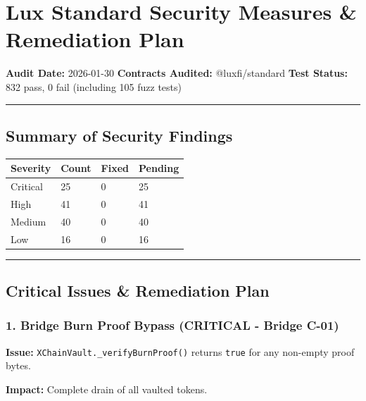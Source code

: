 \documentclass[
]{article}
\author{}
\date{}
\newcounter{none} %
\begin{document}
\section{Lux Standard Security Measures \& Remediation
Plan}\label{lux-standard-security-measures--remediation-plan}

\textbf{Audit Date:} 2026-01-30 \textbf{Contracts Audited:}
@luxfi/standard \textbf{Test Status:} 832 pass, 0 fail (including 105
fuzz tests)

\begin{center}\rule{0.5\linewidth}{0.5pt}\end{center}

\subsection{Summary of Security
Findings}\label{summary-of-security-findings}

{\def\LTcaptype{none} %
\begin{longtable}[]{@{}llll@{}}
\toprule\noalign{}
Severity & Count & Fixed & Pending \\
\midrule\noalign{}
\endhead
\bottomrule\noalign{}
\endlastfoot
Critical & 25 & 0 & 25 \\
High & 41 & 0 & 41 \\
Medium & 40 & 0 & 40 \\
Low & 16 & 0 & 16 \\
\end{longtable}
}

\begin{center}\rule{0.5\linewidth}{0.5pt}\end{center}

\subsection{Critical Issues \& Remediation
Plan}\label{critical-issues--remediation-plan}

\subsubsection{1. Bridge Burn Proof Bypass (CRITICAL - Bridge
C-01)}\label{1-bridge-burn-proof-bypass-critical---bridge-c-01}

\textbf{Issue:} \texttt{XChainVault.\_verifyBurnProof()} returns
\texttt{true} for any non-empty proof bytes.

\textbf{Impact:} Complete drain of all vaulted tokens.
\end{document}
